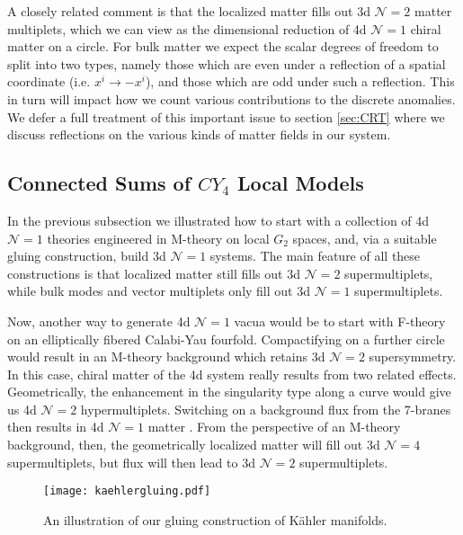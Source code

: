 \documentclass[12pt]{article}%
\numberwithin{equation}{section}
\renewcommand{\(}{\left(}
\renewcommand{\)}{\right)}
\renewcommand{\[}{\left[}
\renewcommand{\]}{\right]}
\begin{document}
A closely related comment is that the localized matter fills out 3d $\mathcal{N} = 2$ matter multiplets, which we can view as the dimensional reduction of 4d $\mathcal{N} = 1$ chiral matter on a circle. For bulk matter we expect the scalar degrees of freedom to split into two types, namely those which are even under a reflection of a spatial coordinate (i.e. $x^{i} \rightarrow - x^{i}$), and those which are odd under such a reflection. This in turn will impact how we count various contributions to the discrete anomalies. We defer a full treatment of this important issue to section \ref{sec:CRT} where we discuss reflections on the various kinds of matter fields in our system.

\subsection{Connected Sums of $CY_4$ Local Models}

In the previous subsection we illustrated how to start with a collection of 4d $\mathcal{N} = 1$ theories engineered in M-theory on local $G_2$ spaces, and, via a suitable gluing construction, build 3d $\mathcal{N} = 1$ systems. The main feature of all these constructions is that localized matter still fills out 3d $\mathcal{N} = 2$ supermultiplets, while bulk modes and vector multiplets only fill out 3d $\mathcal{N} = 1$ supermultiplets.

Now, another way to generate 4d $\mathcal{N} = 1$ vacua would be to start with F-theory on an elliptically fibered Calabi-Yau fourfold. Compactifying on a further circle would result in an M-theory background which retains 3d $\mathcal{N} = 2$ supersymmetry. In this case, chiral matter of the 4d system really results from two related effects. Geometrically, the enhancement in the singularity type along a curve would give us 4d $\mathcal{N} = 2$ hypermultiplets. Switching on a background flux from the 7-branes then results in 4d $\mathcal{N} = 1$ matter \cite{Beasley:2008dc, Donagi:2008ca}. From the perspective of an M-theory background, then, the geometrically localized matter will fill out 3d $\mathcal{N} = 4$ supermultiplets, but flux will then lead to 3d $\mathcal{N} = 2$ supermultiplets.

\begin{figure}[t!]
\centering
\texttt{[image: kaehlergluing.pdf]}
\caption{An illustration of our gluing construction of K\"ahler manifolds.}
\label{fig:kahlergluing}
\end{figure}
\end{document}
